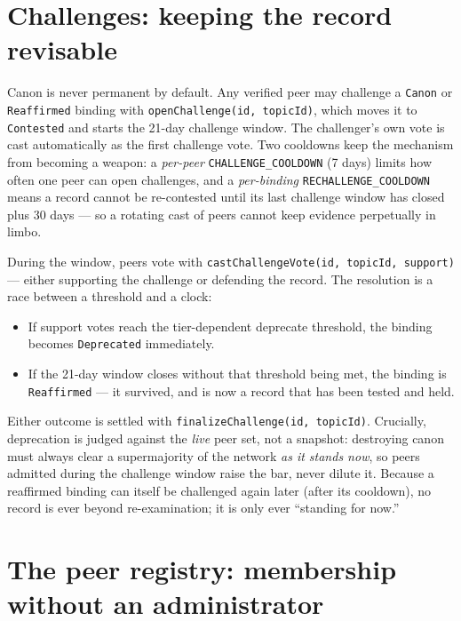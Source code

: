 \documentclass[11pt,a4paper]{article}
\begin{document}
\section{Challenges: keeping the record revisable}

Canon is never permanent by default. Any verified peer may challenge a
\texttt{Canon} or \texttt{Reaffirmed} binding with \texttt{openChallenge(id,
topicId)}, which moves it to \texttt{Contested} and starts the 21-day
challenge window. The challenger's own vote is cast automatically as the
first challenge vote. Two cooldowns keep the mechanism from becoming a weapon:
a \emph{per-peer} \texttt{CHALLENGE\_COOLDOWN} (7 days) limits how often one
peer can open challenges, and a \emph{per-binding}
\texttt{RECHALLENGE\_COOLDOWN} means a record cannot be re-contested until its
last challenge window has closed plus 30 days --- so a rotating cast of peers
cannot keep evidence perpetually in limbo.

During the window, peers vote with \texttt{castChallengeVote(id, topicId,
support)} --- either supporting the challenge or defending the record. The
resolution is a race between a threshold and a clock:

\begin{itemize}[leftmargin=1.4em]
  \item If support votes reach the tier-dependent deprecate threshold, the
  binding becomes \texttt{Deprecated} immediately.
  \item If the 21-day window closes without that threshold being met, the
  binding is \texttt{Reaffirmed} --- it survived, and is now a record that has
  been tested and held.
\end{itemize}

Either outcome is settled with \texttt{finalizeChallenge(id, topicId)}.
Crucially, deprecation is judged against the \emph{live} peer set, not a
snapshot: destroying canon must always clear a supermajority of the network
\emph{as it stands now}, so peers admitted during the challenge window raise
the bar, never dilute it. Because a reaffirmed binding can itself be
challenged again later (after its cooldown), no record is ever beyond
re-examination; it is only ever ``standing for now.''

\section{The peer registry: membership without an administrator}
\end{document}
